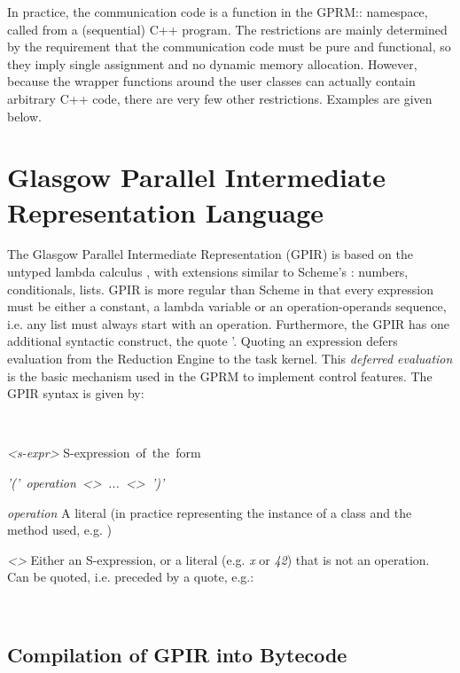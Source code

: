 \documentclass[copyright,creativecommons]{eptcs}
\begin{document}
In practice, the communication code is a function in the GPRM:: namespace,
called from a (sequential) C++ program. The restrictions are mainly
determined by the requirement that the communication code must be
pure and functional, so they imply single assignment and no dynamic
memory allocation. However, because the wrapper functions around the
user classes can actually contain arbitrary C++ code, there are very
few other restrictions. Examples are given below.


\section{Glasgow Parallel Intermediate Representation Language}

The Glasgow Parallel Intermediate Representation (GPIR) is based on
the untyped lambda calculus \cite{pierce2002types}, with extensions
similar to Scheme's \cite{Sussman75scheme:an}: numbers, conditionals,
lists. GPIR is more regular than Scheme in that every expression must
be either a constant, a lambda variable or an operation-operands sequence,
i.e. any list must always start with an operation. Furthermore, the
GPIR has one additional syntactic construct, the quote '. Quoting
an expression defers evaluation from the Reduction Engine to the task
kernel. This \emph{deferred evaluation} is the basic mechanism used
in the GPRM to implement control features. The GPIR syntax is given
by:

~

\emph{<s-expr>} S-expression~of~the~form

\emph{'('~operation~<>~...~<>~')'}

\emph{operation} A literal (in practice representing the instance
of a class and the method used, e.g. )

\emph{<}\emph{>} Either an S-expression, or a literal (e.g.
\emph{x} or \emph{42}) that is not an operation. Can be quoted, i.e.
preceded by a quote, e.g.: 

~


\subsection{Compilation of GPIR into Bytecode\label{Compilation-of-GPIR}}
\end{document}
